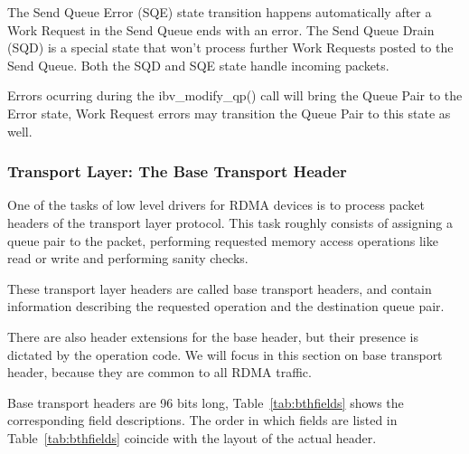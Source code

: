 The Send Queue Error (SQE) state transition happens automatically
after a Work Request in the Send Queue ends with an error\cite{QPStateMachine2012}. The Send Queue Drain (SQD) is a special state
that won't process further Work Requests posted to the Send Queue\cite{QPStateMachine2012}. Both the SQD and SQE state handle incoming packets\cite{barakVerbsProgrammingTutorial2014}.

Errors ocurring during the ibv\_modify\_qp() call will bring the Queue Pair
to the Error state, Work Request errors may transition the Queue Pair to this state as well\cite{QPStateMachine2012}.

\subsubsection{Transport Layer: The Base Transport Header}

One of the tasks of low level drivers for RDMA devices is to process
packet headers of the transport layer protocol. This task roughly consists
of assigning a queue pair to the packet, performing requested memory access operations like
read or write and performing sanity checks.

These transport layer headers are called
base transport headers, and contain information describing the
requested operation and the  destination queue pair.

There are also header extensions for the base header, but their presence is dictated
by the operation code. We will focus in this section on base transport header,
because they are common to all RDMA traffic.

Base transport headers are 96 bits long, Table~\ref{tab:bthfields} shows the corresponding field descriptions. The order in which fields
are listed in Table~\ref{tab:bthfields} coincide with the layout of the actual header.


